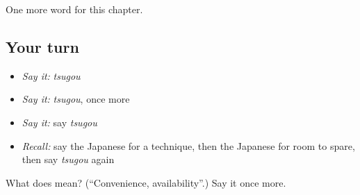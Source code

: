 \begin{grammarlens}[title={What you've built}]
One more word for this chapter.
\end{grammarlens}

\subsection*{Your turn}
\begin{itemize}
\raggedright
  \item \emph{Say it:} \emph{tsugou}
  \item \emph{Say it:} \emph{tsugou}, once more
  \item \emph{Say it:} say \emph{tsugou}
  \item \emph{Recall:} say the Japanese for a technique, then the Japanese for room to spare, then say \emph{tsugou} again
\end{itemize}

\begin{tcolorbox}[breakable,colback=teal!4,colframe=teal!35!black,title={Before you move on}]
What does  mean? (\textquotedblleft{}Convenience, availability\textquotedblright{}.) Say it once more.
\end{tcolorbox}
